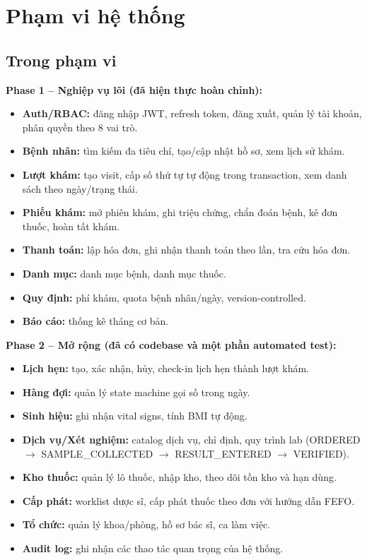 \section{Phạm vi hệ thống}
\label{sec:srs-scope}

\subsection{Trong phạm vi}
\label{subsec:srs-in-scope}

\textbf{Phase 1 -- Nghiệp vụ lõi (đã hiện thực hoàn chỉnh):}

\begin{itemize}
    \item \textbf{Auth/RBAC:} đăng nhập JWT, refresh token, đăng xuất, quản lý tài khoản, phân quyền theo 8 vai trò.
    \item \textbf{Bệnh nhân:} tìm kiếm đa tiêu chí, tạo/cập nhật hồ sơ, xem lịch sử khám.
    \item \textbf{Lượt khám:} tạo visit, cấp số thứ tự tự động trong transaction, xem danh sách theo ngày/trạng thái.
    \item \textbf{Phiếu khám:} mở phiên khám, ghi triệu chứng, chẩn đoán bệnh, kê đơn thuốc, hoàn tất khám.
    \item \textbf{Thanh toán:} lập hóa đơn, ghi nhận thanh toán theo lần, tra cứu hóa đơn.
    \item \textbf{Danh mục:} danh mục bệnh, danh mục thuốc.
    \item \textbf{Quy định:} phí khám, quota bệnh nhân/ngày, version-controlled.
    \item \textbf{Báo cáo:} thống kê tháng cơ bản.
\end{itemize}

\textbf{Phase 2 -- Mở rộng (đã có codebase và một phần automated test):}

\begin{itemize}
    \item \textbf{Lịch hẹn:} tạo, xác nhận, hủy, check-in lịch hẹn thành lượt khám.
    \item \textbf{Hàng đợi:} quản lý state machine gọi số trong ngày.
    \item \textbf{Sinh hiệu:} ghi nhận vital signs, tính BMI tự động.
    \item \textbf{Dịch vụ/Xét nghiệm:} catalog dịch vụ, chỉ định, quy trình lab (ORDERED $\rightarrow$ SAMPLE\_COLLECTED $\rightarrow$ RESULT\_ENTERED $\rightarrow$ VERIFIED).
    \item \textbf{Kho thuốc:} quản lý lô thuốc, nhập kho, theo dõi tồn kho và hạn dùng.
    \item \textbf{Cấp phát:} worklist dược sĩ, cấp phát thuốc theo đơn với hướng dẫn FEFO.
    \item \textbf{Tổ chức:} quản lý khoa/phòng, hồ sơ bác sĩ, ca làm việc.
    \item \textbf{Audit log:} ghi nhận các thao tác quan trọng của hệ thống.
\end{itemize}

